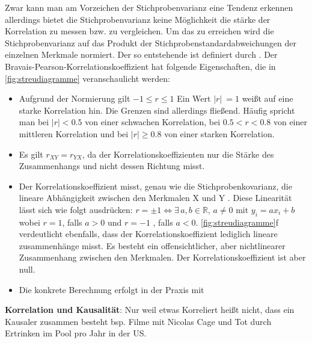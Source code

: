 Zwar kann man am Vorzeichen der Stichprobenvarianz eine Tendenz erkennen allerdings bietet die Stichprobenvarianz keine Möglichkeit die stärke der Korrelation zu messen bzw. zu vergleichen. Um das zu erreichen wird die Stichprobenvarianz auf das Produkt der Stichprobenstandardabweichungen der einzelnen Merkmale normiert. Der so entstehende  ist definiert durch . Der Bravais-Pearson-Korrelationskoeffizient hat folgende Eigenschaften, die in \cref{fig:streudiagramme} veranschaulicht werden:
\begin{itemize}[leftmargin=*]
    \itemsep0em 
    \item Aufgrund der Normierung gilt $-1 \le r \le 1$ Ein Wert $|r|~=1$ weißt auf eine starke Korrelation hin. Die Grenzen sind allerdings fließend. Häufig spricht man bei $|r| < 0.5$ von einer schwachen  Korrelation, bei $0.5 < r < 0.8$ von einer mittleren Korrelation und bei $|r| \ge 0.8$ von einer starken Korrelation.
    \item Es gilt $r_{XY} = r_{YX}$, da der Korrelationskoeffizienten nur die Stärke des Zusammenhangs und nicht dessen Richtung misst.
    \item Der Korrelationskoeffizient misst, genau wie die Stichprobenkovarianz, die lineare Abhängigkeit zwischen den Merkmalen X und Y . Diese Linearität lässt sich wie folgt ausdrücken: $r = \pm 1 \Leftrightarrow \exists\, a, b \in \mathds{R},\, a \neq 0 \text{ mit } y_i = ax_i + b$ wobei $r = 1$, falls $a > 0$ und $r = -1$ , falls $a < 0$. \cref{fig:streudiagramme}f verdeutlicht ebenfalls, dass der Korrelationskoeffizient lediglich lineare zusammenhänge misst. Es besteht ein offensichtlicher, aber nichtlinearer Zusammenhang zwischen den Merkmalen. Der Korrelationskoeffizient ist aber null.
    \item Die konkrete Berechnung erfolgt in der Praxis mit 
\end{itemize}
\textbf{Korrelation und Kausalität}: Nur weil etwas Korreliert heißt nicht, dass ein Kausaler zusammen besteht bsp. Filme mit Nicolas Cage und Tot durch Ertrinken im Pool pro Jahr in der US.\\

